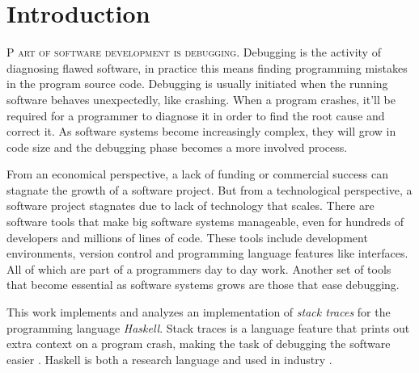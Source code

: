 \chapter{Introduction}
\lettrine[lines=4, loversize=-0.1, lraise=0.1]{P}{
art of software development is debugging}. Debugging is the activity of
diagnosing flawed software, in practice this means finding programming mistakes
in the program source code. Debugging is usually initiated when the running
software behaves unexpectedly, like crashing. When a program crashes, it'll be
required for a programmer to diagnose it in order to find the root cause and
correct it. As software systems become increasingly complex, they will grow in
code size and the debugging phase becomes a more involved process.

From an economical perspective, a lack of funding or commercial success can
stagnate the growth of a software project. But from a technological perspective, a
software project stagnates due to lack of technology that scales. There are
software tools that make big software systems manageable, even for
hundreds of developers and millions of lines of code. These tools include
development environments, version control and programming language features
like interfaces. All of which are part of a programmers day to day work.
Another set of tools that become essential as software systems grows are those
that ease debugging.

This work implements and analyzes an implementation of \emph{stack traces} for
the programming language \emph{Haskell}. Stack traces is a language feature
that prints out extra context on a program crash, making the task of debugging
the software easier \cite{schroter2010stack}. Haskell is both a research language
\cite{haskell_org_research_papers, dagit_getting_started_with_ghc_hacking}
and used in industry \cite{haskell_in_industry, fpcomplete_case_studies}.

